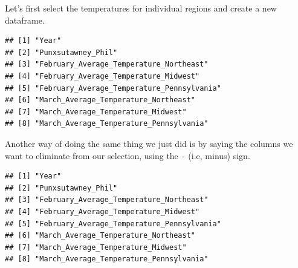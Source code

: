 \documentclass[
]{book}
\newenvironment{Shaded}{\begin{snugshade}}{\end{snugshade}}
\newcommand{\KeywordTok}[1]{\textcolor[rgb]{0.13,0.29,0.53}{\textbf{#1}}}
\newcommand{\NormalTok}[1]{#1}
\newcommand{\OperatorTok}[1]{\textcolor[rgb]{0.81,0.36,0.00}{\textbf{#1}}}
\newcommand{\StringTok}[1]{\textcolor[rgb]{0.31,0.60,0.02}{#1}}
\begin{document}
Let's first select the temperatures for individual regions and create a new dataframe.

\begin{Shaded}
\end{Shaded}

\begin{verbatim}
## [1] "Year"                                     
## [2] "Punxsutawney_Phil"                        
## [3] "February_Average_Temperature_Northeast"   
## [4] "February_Average_Temperature_Midwest"     
## [5] "February_Average_Temperature_Pennsylvania"
## [6] "March_Average_Temperature_Northeast"      
## [7] "March_Average_Temperature_Midwest"        
## [8] "March_Average_Temperature_Pennsylvania"
\end{verbatim}

Another way of doing the same thing we just did is by saying the columns we want to eliminate from our selection, using the \texttt{-} (i.e, minus) sign.

\begin{Shaded}
\end{Shaded}

\begin{verbatim}
## [1] "Year"                                     
## [2] "Punxsutawney_Phil"                        
## [3] "February_Average_Temperature_Northeast"   
## [4] "February_Average_Temperature_Midwest"     
## [5] "February_Average_Temperature_Pennsylvania"
## [6] "March_Average_Temperature_Northeast"      
## [7] "March_Average_Temperature_Midwest"        
## [8] "March_Average_Temperature_Pennsylvania"
\end{verbatim}
\end{document}
